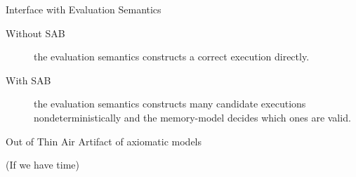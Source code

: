 \documentclass{beamer}
\begin{document}
\begin{frame}{Interface with Evaluation Semantics}
  \begin{description}
  \item[Without SAB] the evaluation semantics constructs a correct execution directly.
  \item[With SAB] the evaluation semantics constructs many candidate executions nondeterministically and the memory-model decides which ones are valid.
  \end{description}

\end{frame}

\begin{frame}{Out of Thin Air}
  Artifact of axiomatic models

  (If we have time)
\end{frame}
\end{document}
